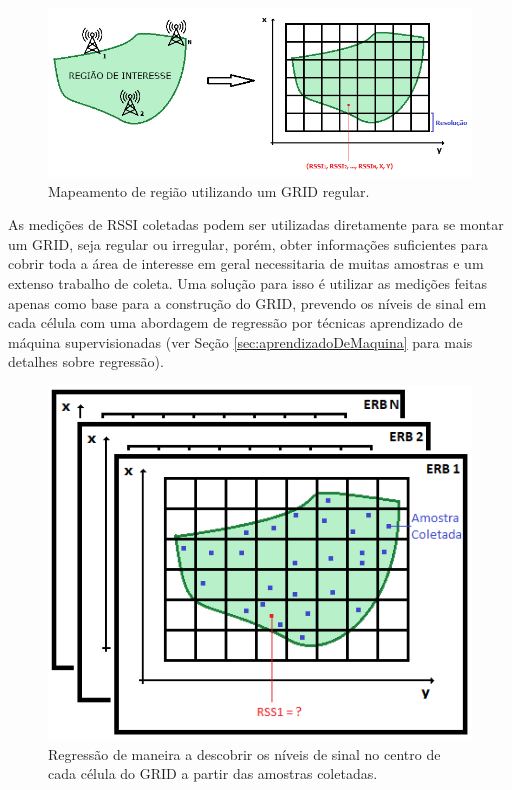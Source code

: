 \documentclass[12pt]{article}
\begin{document}
				\begin{figure}[H]
                \centering
                \includegraphics[width=14cm]{images/gridRegular.png}\par
                \caption{Mapeamento de região utilizando um GRID regular.}
                \label{fig:gridRegular}
                \end{figure}
				
				As medições de RSSI coletadas podem ser utilizadas diretamente para se montar um GRID, seja regular ou irregular, porém, obter informações suficientes para cobrir toda a área de interesse em geral necessitaria de muitas amostras e um extenso trabalho de coleta. Uma solução para isso é utilizar as medições feitas apenas como base para a construção do GRID, prevendo os níveis de sinal em cada célula com uma abordagem de regressão por técnicas aprendizado de máquina supervisionadas (ver Seção \ref{sec:aprendizadoDeMaquina} para mais detalhes sobre regressão).
				
				\begin{figure}[H]
                \centering
                \includegraphics[width=14cm]{images/regressaoFingerprinting.png}\par
                \caption{Regressão de maneira a descobrir os níveis de sinal no centro de cada célula do GRID a partir das amostras coletadas.}
                \label{fig:regressaoFingerprinting}
                \end{figure}
				
\end{document}

